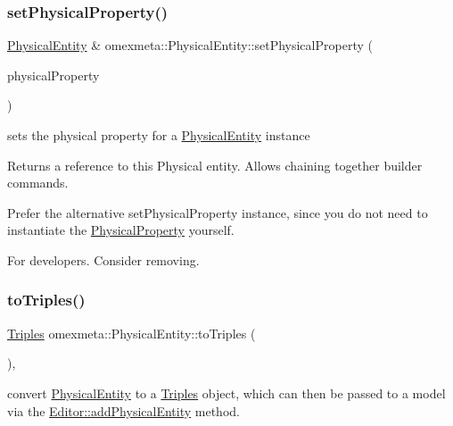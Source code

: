 \subsubsection{\texorpdfstring{set\+Physical\+Property()}{setPhysicalProperty()}\hspace{0.1cm}{\footnotesize\ttfamily [2/2]}}
{\footnotesize\ttfamily \hyperlink{classomexmeta_1_1PhysicalEntity}{Physical\+Entity} \& omexmeta\+::\+Physical\+Entity\+::set\+Physical\+Property (\begin{DoxyParamCaption}\item[{\hyperlink{classomexmeta_1_1PhysicalProperty}{Physical\+Property}}]{physical\+Property }\end{DoxyParamCaption})}



sets the physical property for a \hyperlink{classomexmeta_1_1PhysicalEntity}{Physical\+Entity} instance 

\begin{DoxyReturn}{Returns}
a reference to this Physical entity. Allows chaining together builder commands.
\end{DoxyReturn}
Prefer the alternative set\+Physical\+Property instance, since you do not need to instantiate the \hyperlink{classomexmeta_1_1PhysicalProperty}{Physical\+Property} yourself.

For developers. Consider removing. \mbox{\label{classomexmeta_1_1PhysicalEntity_a51f5df8b2e8a1d65e5aa0d10e53b77ba}} 
\subsubsection{\texorpdfstring{to\+Triples()}{toTriples()}}
{\footnotesize\ttfamily \hyperlink{classomexmeta_1_1Triples}{Triples} omexmeta\+::\+Physical\+Entity\+::to\+Triples (\begin{DoxyParamCaption}{ }\end{DoxyParamCaption})\hspace{0.3cm}{\ttfamily [override]}, {\ttfamily [virtual]}}



convert \hyperlink{classomexmeta_1_1PhysicalEntity}{Physical\+Entity} to a \hyperlink{classomexmeta_1_1Triples}{Triples} object, which can then be passed to a model via the \hyperlink{classomexmeta_1_1Editor_a0740831baafe244374ad7a324d51a87e}{Editor\+::add\+Physical\+Entity} method. 

